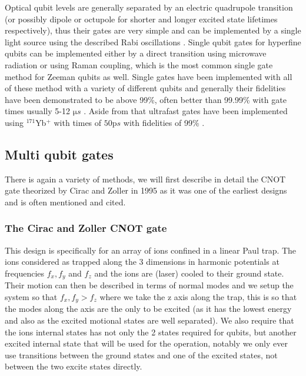 Optical qubit levels are generally separated by an electric quadrupole transition (or possibly dipole or octupole for shorter and longer excited state lifetimes respectively), thus their gates are very simple and can be implemented by a single light source using the described Rabi oscillations \cite{bruzewiczTrappedionQuantumComputing2019}.
Single qubit gates for hyperfine qubits can be implemented either by a direct transition using microwave radiation or using Raman coupling, which is the most common single gate method for Zeeman qubits as well.
Single gates have been implemented with all of these method with a variety of different qubits and generally their fidelities have been demonstrated to be above 99\%, often better than 99.99\% with gate times usually 5-12 $\si{\micro s}$ \cite{bruzewiczTrappedionQuantumComputing2019}.
Aside from that ultrafast gates have been implemented using $^{171}$Yb$^+$ with times of $50\si{\pico s}$ with fidelities of 99\% \cite{campbellUltrafastGatesSingle2010}.

\subsection{Multi qubit gates}
There is again a variety of methods, we will first describe in detail the CNOT gate theorized by Cirac and Zoller in 1995 \cite{ciracQuantumComputationsCold1995} as it was one of the earliest designs and is often mentioned and cited.

\subsubsection{The Cirac and Zoller CNOT gate \cite{ciracQuantumComputationsCold1995}} This design is specifically for an array of ions confined in a linear Paul trap.
The ions considered as trapped along the 3 dimensions in harmonic potentials at frequencies $f_x, f_y$ and $f_z$ and the ions are (laser) cooled to their ground state.
Their motion can then be described in terms of normal modes and we setup the system so that $f_x, f_y > f_z$ where we take the z axis along the trap, this is so that the modes along the axis are the only to be excited (as it has the lowest energy and also as the excited motional states are well separated).
We also require that the ions internal states has not only the 2 states required for qubits, but another excited internal state that will be used for the operation, notably we only ever use transitions between the ground states and one of the excited states, not between the two excite states directly.

